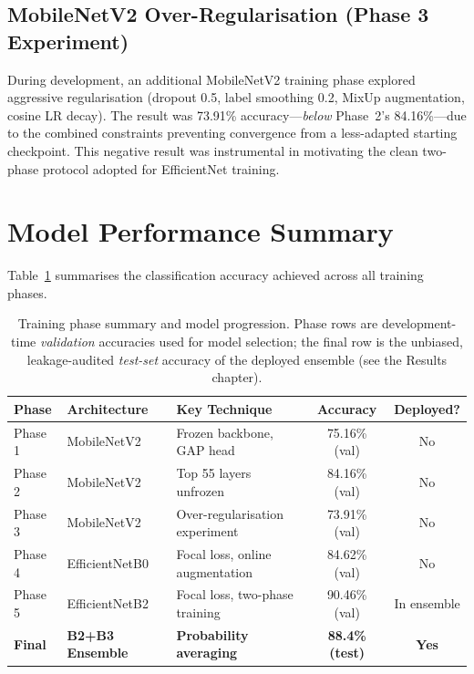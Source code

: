 \subsection{MobileNetV2 Over-Regularisation (Phase 3 Experiment)}

During development, an additional MobileNetV2 training phase explored aggressive regularisation (dropout 0.5, label smoothing 0.2, MixUp augmentation, cosine LR decay). The result was 73.91\% accuracy---\textit{below} Phase~2's 84.16\%---due to the combined constraints preventing convergence from a less-adapted starting checkpoint. This negative result was instrumental in motivating the clean two-phase protocol adopted for EfficientNet training.


\section{Model Performance Summary}
\label{sec:summary}

Table~\ref{tab:model_summary} summarises the classification accuracy achieved across all training phases.

\begin{table}[H]
\centering
\caption{Training phase summary and model progression. Phase rows are
development-time \emph{validation} accuracies used for model selection; the final
row is the unbiased, leakage-audited \emph{test-set} accuracy of the deployed
ensemble (see the Results chapter).}
\label{tab:model_summary}
\begin{tabular}{|l|l|l|c|c|}
\hline
\textbf{Phase} & \textbf{Architecture} & \textbf{Key Technique} & \textbf{Accuracy} & \textbf{Deployed?} \\ \hline
Phase 1 & MobileNetV2 & Frozen backbone, GAP head & 75.16\% (val) & No \\ \hline
Phase 2 & MobileNetV2 & Top 55 layers unfrozen & 84.16\% (val) & No \\ \hline
Phase 3 & MobileNetV2 & Over-regularisation experiment & 73.91\% (val) & No \\ \hline
Phase 4 & EfficientNetB0 & Focal loss, online augmentation & 84.62\% (val) & No \\ \hline
Phase 5 & EfficientNetB2 & Focal loss, two-phase training & 90.46\% (val) & In ensemble \\ \hline
\textbf{Final} & \textbf{B2+B3 Ensemble} & \textbf{Probability averaging} & \textbf{88.4\% (test)} & \textbf{Yes} \\ \hline
\end{tabular}
\end{table}

